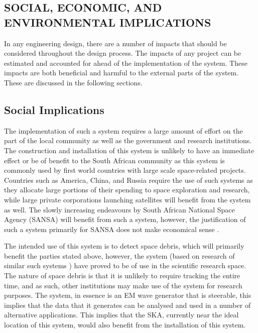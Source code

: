\documentclass[11pt]{witseiepaper}
\begin{document}
\newpage
\onecolumn
{}
\setcounter{page}{1}
\setcounter{figure}{0} 
\renewcommand{\thefigure}
{A\arabic{figure}}

\onecolumn
\begin{bibunit}[witseie]
\appendix



\section{SOCIAL, ECONOMIC, AND ENVIRONMENTAL IMPLICATIONS} \label{sec:SOCIALECONOMICANDENVIRONMENTALIMPLICATIONS}
In any engineering design, there are a number of impacts that should be considered throughout the design process. The impacts of any project can be estimated and accounted for ahead of the implementation of the system. These impacts are both beneficial and harmful to the external parts of the system. These are discussed in the following sections.

\subsection{Social Implications} \label{sec:SocialImplications}

The implementation of such a system requires a large amount of effort on the part of the local community as well as the government and research institutions.
The construction and installation of this system is unlikely to have an immediate effect or be of benefit to the South African community as this system is commonly used by first world countries with large scale space-related projects. Countries such as America, China, and Russia require the use of such systems as they allocate large portions of their spending to space exploration and research, while large private corporations launching satellites will benefit from the system as well. The slowly increasing endeavours by South African National Space Agency (SANSA) will benefit from such a system, however, the justification of such a system primarily for SANSA does not make economical sense \cite{SANSA}.

The intended use of this system is to detect space debris, which will primarily benefit the parties stated above, however, the system (based on research of similar such systems \cite{AMISR,EISCAT}) have proved to be of use in the scientific research space.
The nature of space debris is that it is unlikely to require tracking the entire time, and as such, other institutions may make use of the system for research purposes. The system, in essence is an EM wave generator that is steerable, this implies that the data that it generates can be analysed and used in a number of alternative applications.
This implies that the SKA, currently near the ideal location of this system, would also benefit from the installation of this system.



\end{bibunit}
\end{document}
